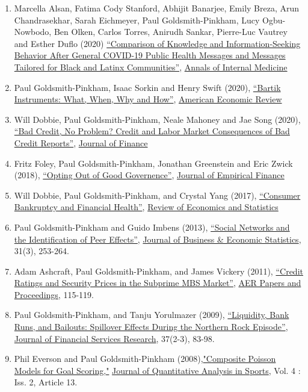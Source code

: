 \documentclass[letterpaper]{article}
\begin{document}
\begin{enumerate}
	\item Marcella Alsan, Fatima Cody Stanford, Abhijit Banarjee, Emily Breza, Arun Chandrasekhar, Sarah Eichmeyer, Paul Goldsmith-Pinkham, Lucy Ogbu-Nowbodo, Ben Olken, Carlos Torres, Anirudh Sankar, Pierre-Luc Vautrey and Esther Duflo (2020) \href{https://www.acpjournals.org/doi/10.7326/M20-6141}{``Comparison of Knowledge and Information-Seeking Behavior After General COVID-19 Public Health Messages and Messages Tailored for Black and Latinx Communities''}, \ul{Annals of Internal Medicine}
	\item Paul Goldsmith-Pinkham, Isaac Sorkin and Henry Swift (2020), \href{http://paulgp.github.io/papers/bartik_gpss.pdf}{``Bartik Instruments: What, When, Why and How''}, \ul{American Economic Review}
	\item Will Dobbie, Paul Goldsmith-Pinkham, Neale Mahoney and Jae Song (2020), \href{https://papers.ssrn.com/sol3/papers.cfm?abstract_id=2844316}{``Bad Credit, No Problem? Credit and Labor Market Consequences of Bad Credit Reports''}, \ul{Journal of Finance}
	\item Fritz Foley, Paul Goldsmith-Pinkham, Jonathan Greenstein and Eric Zwick (2018), \href{http://www.nber.org/papers/w19953}{``Opting Out of Good Governence''}, \ul{Journal of Empirical Finance}
	\item Will Dobbie, Paul Goldsmith-Pinkham, and Crystal Yang (2017), \href{http://www.nber.org/papers/w21032}{``Consumer Bankruptcy and Financial Health''}, \ul{Review of Economics and Statistics}
	\item Paul Goldsmith-Pinkham and Guido Imbens (2013), \href{http://www.tandfonline.com/doi/pdf/10.1080/07350015.2013.801251}{``Social Networks and the Identification of Peer Effects''}, \ul{Journal of Business \& Economic Statistics}, 31(3), 253-264.
	\item Adam Ashcraft, Paul Goldsmith-Pinkham, and James Vickery (2011), \href{http://papers.ssrn.com.ezp-prod1.hul.harvard.edu/sol3/papers.cfm?abstract_id=1856823}{``Credit Ratings
		      and Security Prices in the Subprime MBS Market''}, \ul{AER Papers and Proceedings},  115-119.
	\item Paul Goldsmith-Pinkham, and Tanju Yorulmazer (2009), \href{http://www.springerlink.com/content/ww187761jgr660q5/}{``Liquidity, Bank Runs, and Bailouts: Spillover Effects During the Northern Rock Episode''}, \ul{Journal of Financial Services Research}, 37(2-3), 83-98.
	\item Phil Everson and Paul Goldsmith-Pinkham (2008),\href{http://www.bepress.com/jqas/vol4/iss2/13/}{"Composite Poisson Models for Goal Scoring,"} \ul{Journal of Quantitative Analysis in Sports}, Vol. 4 : Iss. 2, Article 13.
\end{enumerate}
\end{document}
